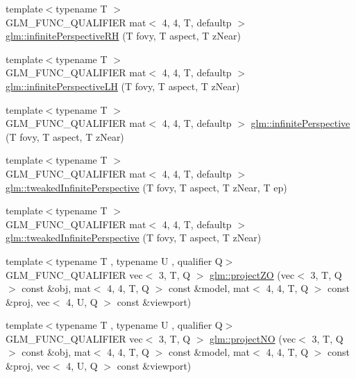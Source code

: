 \begin{DoxyCompactItemize}
\item 
{\footnotesize template$<$typename T $>$ }\\G\+L\+M\+\_\+\+F\+U\+N\+C\+\_\+\+Q\+U\+A\+L\+I\+F\+I\+ER mat$<$ 4, 4, T, defaultp $>$ \hyperlink{group__gtc__matrix__transform_ga99672ffe5714ef478dab2437255fe7e1}{glm\+::infinite\+Perspective\+RH} (T fovy, T aspect, T z\+Near)
\item 
{\footnotesize template$<$typename T $>$ }\\G\+L\+M\+\_\+\+F\+U\+N\+C\+\_\+\+Q\+U\+A\+L\+I\+F\+I\+ER mat$<$ 4, 4, T, defaultp $>$ \hyperlink{group__gtc__matrix__transform_ga3201b30f5b3ea0f933246d87bfb992a9}{glm\+::infinite\+Perspective\+LH} (T fovy, T aspect, T z\+Near)
\item 
{\footnotesize template$<$typename T $>$ }\\G\+L\+M\+\_\+\+F\+U\+N\+C\+\_\+\+Q\+U\+A\+L\+I\+F\+I\+ER mat$<$ 4, 4, T, defaultp $>$ \hyperlink{group__gtc__matrix__transform_ga44fa38a18349450325cae2661bb115ca}{glm\+::infinite\+Perspective} (T fovy, T aspect, T z\+Near)
\item 
{\footnotesize template$<$typename T $>$ }\\G\+L\+M\+\_\+\+F\+U\+N\+C\+\_\+\+Q\+U\+A\+L\+I\+F\+I\+ER mat$<$ 4, 4, T, defaultp $>$ \hyperlink{group__gtc__matrix__transform_gaf5b3c85ff6737030a1d2214474ffa7a8}{glm\+::tweaked\+Infinite\+Perspective} (T fovy, T aspect, T z\+Near, T ep)
\item 
{\footnotesize template$<$typename T $>$ }\\G\+L\+M\+\_\+\+F\+U\+N\+C\+\_\+\+Q\+U\+A\+L\+I\+F\+I\+ER mat$<$ 4, 4, T, defaultp $>$ \hyperlink{group__gtc__matrix__transform_gaaeacc04a2a6f4b18c5899d37e7bb3ef9}{glm\+::tweaked\+Infinite\+Perspective} (T fovy, T aspect, T z\+Near)
\item 
{\footnotesize template$<$typename T , typename U , qualifier Q$>$ }\\G\+L\+M\+\_\+\+F\+U\+N\+C\+\_\+\+Q\+U\+A\+L\+I\+F\+I\+ER vec$<$ 3, T, Q $>$ \hyperlink{group__gtc__matrix__transform_ga77d157525063dec83a557186873ee080}{glm\+::project\+ZO} (vec$<$ 3, T, Q $>$ const \&obj, mat$<$ 4, 4, T, Q $>$ const \&model, mat$<$ 4, 4, T, Q $>$ const \&proj, vec$<$ 4, U, Q $>$ const \&viewport)
\item 
{\footnotesize template$<$typename T , typename U , qualifier Q$>$ }\\G\+L\+M\+\_\+\+F\+U\+N\+C\+\_\+\+Q\+U\+A\+L\+I\+F\+I\+ER vec$<$ 3, T, Q $>$ \hyperlink{group__gtc__matrix__transform_ga05249751f48d14cb282e4979802b8111}{glm\+::project\+NO} (vec$<$ 3, T, Q $>$ const \&obj, mat$<$ 4, 4, T, Q $>$ const \&model, mat$<$ 4, 4, T, Q $>$ const \&proj, vec$<$ 4, U, Q $>$ const \&viewport)

\end{DoxyCompactItemize}
